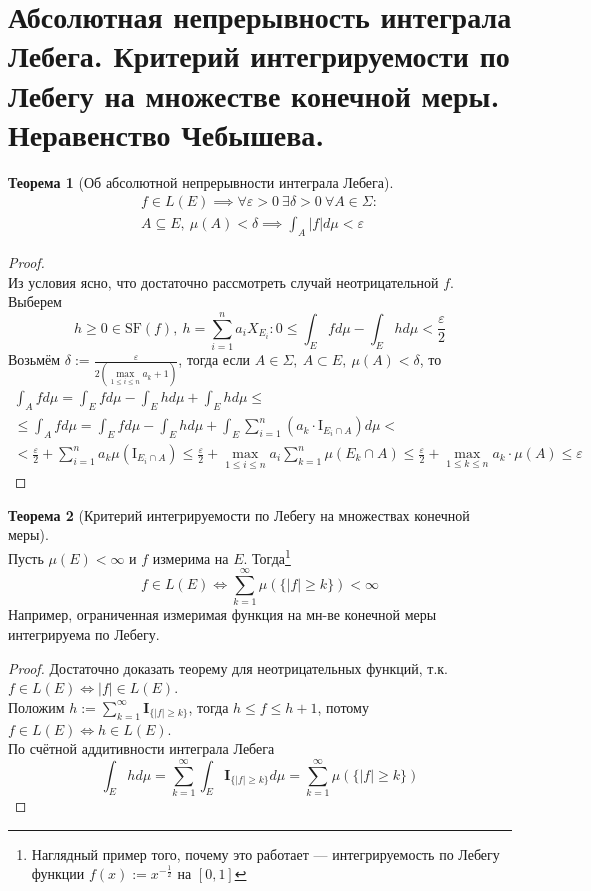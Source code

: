 \documentclass[11pt,a4paper]{report}
\def\eps{\varepsilon}
\theoremstyle{definition}
\theoremstyle{definition}
\newtheorem{theorem}{Теорема}[section]
\theoremstyle{definition}
\begin{document}
	\section{Абсолютная непрерывность интеграла Лебега. Критерий интегрируемости по Лебегу на множестве конечной меры. Неравенство Чебышева.}
	\begin{theorem}[Об абсолютной непрерывности интеграла Лебега]		
		\begin{gather*} 
			f \in L(E) \implies \forall \eps > 0\ \exists \delta > 0\ \forall A \in \Sigma:\\ 
			A \subseteq E,\ \mu(A) < \delta \implies \int_{A} |f| d\mu < \eps 
		\end{gather*}
	\end{theorem}
	\begin{proof}$  $\\
		Из условия ясно, что достаточно рассмотреть случай неотрицательной $ f $.
		Выберем 
		\[ h \ge 0 \in \mbox{SF}(f),\ h = \sum\limits_{i=1}^{n}a_{i} X_{E_{i}}: 0 \le \int_{E} f d\mu - \int_{E} h d\mu < \frac{\eps}{2} \]
		Возьмём $ \delta := \frac{\eps}{2 \left (\max\limits_{1 \le i \le n} a_{k} + 1\right )} $, тогда если $ A \in \Sigma,\ A \subset E,\ \mu(A) < \delta $, то 
		\begin{gather*}
			\int_{A} f d\mu = \int_{E} f d\mu - \int_{E} h d\mu + \int_{E} h d\mu \le\\\le \int_{A} f d\mu = \int_{E} f d\mu - \int_{E} h d\mu + \int_{E} \sum_{i=1}^{n} (a_{k} \cdot \mbox{I}_{E_{i} \cap A}) d\mu <\\< \frac{\eps}{2} + \sum_{i=1}^{n} a_{k} \mu(\mbox{I}_{E_{i} \cap A}) \le \frac{\eps}{2} + \max\limits_{1 \le i \le n} a_{i} \sum\limits_{k=1}^{n} \mu(E_{k} \cap A) \le \frac{\eps}{2} + \max\limits_{1 \le k \le n} a_{k} \cdot \mu(A) \le \eps
		\end{gather*}
	\end{proof}
	\begin{theorem}[Критерий интегрируемости по Лебегу на множествах конечной меры]$  $\\
		Пусть $ \mu(E) < \infty $ и $ f $ измерима на $ E $. Тогда\footnote{Наглядный пример того, почему это работает — интегрируемость по Лебегу функции $ f(x) := x^{-\frac{1}{2}} $ на $ [0, 1] $ } 
		\[ f \in L(E) \iff \sum\limits_{k=1}^{\infty} \mu(\{ |f| \ge k \}) < \infty \]
		Например, ограниченная измеримая функция на мн-ве конечной меры интегрируема по Лебегу.
	\end{theorem}
	\begin{proof}
		Достаточно доказать теорему для неотрицательных функций, т.к. $ f \in L(E) \iff |f| \in L(E) $.\\
		Положим $ h := \sum\limits_{k=1}^{\infty} \mathbf{I}_{\{ |f| \ge k \}} $, тогда $ h \le f \le h+1 $, потому $ f \in L(E) \iff h \in L(E) $.\\
		По счётной аддитивности интеграла Лебега
		\[
			\int_{E} h d\mu = \sum\limits_{k=1}^{\infty} \int_{E} \mathbf{I}_{\{ |f| \ge k \}} d\mu = \sum\limits_{k=1}^{\infty} \mu(\{ |f| \ge k \})
		\]
	\end{proof}
\end{document}
